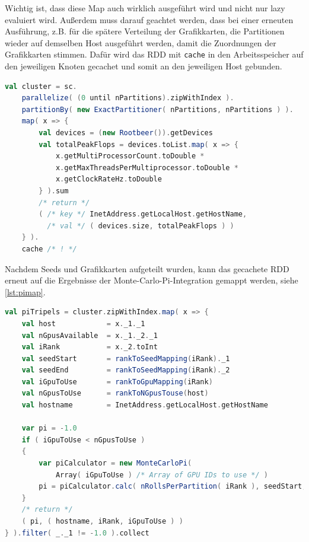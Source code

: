 Wichtig ist, dass diese Map auch wirklich ausgeführt wird und nicht nur lazy evaluiert wird.
Außerdem muss darauf geachtet werden, dass bei einer erneuten Ausführung, z.B. für die spätere Verteilung der Grafikkarten, die Partitionen wieder auf demselben Host ausgeführt werden, damit die Zuordnungen der Grafikkarten stimmen.
Dafür wird das RDD mit \lstinline!cache! in den Arbeitsspeicher auf den jeweiligen Knoten gecachet und somit an den jeweiligen Host gebunden.

\begin{lstlisting}[language=Scala,caption={Ausschnitt aus \lstinline!getClusterGpuConfiguration!, vgl. \lstinline!multiNode/multiGpu/scala/TestMonteCarloPi.scala!},label=lst:clusterconfig]
val cluster = sc.
    parallelize( (0 until nPartitions).zipWithIndex ).
    partitionBy( new ExactPartitioner( nPartitions, nPartitions ) ).
    map( x => {
        val devices = (new Rootbeer()).getDevices
        val totalPeakFlops = devices.toList.map( x => {
            x.getMultiProcessorCount.toDouble *
            x.getMaxThreadsPerMultiprocessor.toDouble *
            x.getClockRateHz.toDouble
        } ).sum
        /* return */
        ( /* key */ InetAddress.getLocalHost.getHostName,
          /* val */ ( devices.size, totalPeakFlops ) )
    } ).
    cache /* ! */
\end{lstlisting}

Nachdem Seeds und Grafikkarten aufgeteilt wurden, kann das gecachete RDD erneut auf die Ergebnisse der Monte-Carlo-Pi-Integration gemappt werden, siehe \autoref{lst:pimap}.
\begin{lstlisting}[language=Scala,label=lst:pimap,caption={Start der Berechnung über Spark und Rootbeer, vgl. \lstinline!TestMonteCarloPi.scala! \cite{scaromare}}]
val piTripels = cluster.zipWithIndex.map( x => {
    val host            = x._1._1
    val nGpusAvailable  = x._1._2._1
    val iRank           = x._2.toInt
    val seedStart       = rankToSeedMapping(iRank)._1
    val seedEnd         = rankToSeedMapping(iRank)._2
    val iGpuToUse       = rankToGpuMapping(iRank)
    val nGpusToUse      = rankToNGpusTouse(host)
    val hostname        = InetAddress.getLocalHost.getHostName

    var pi = -1.0
    if ( iGpuToUse < nGpusToUse )
    {
        var piCalculator = new MonteCarloPi(
            Array( iGpuToUse ) /* Array of GPU IDs to use */ )
        pi = piCalculator.calc( nRollsPerPartition( iRank ), seedStart, seedEnd )
    }
    /* return */
    ( pi, ( hostname, iRank, iGpuToUse ) )
} ).filter( _._1 != -1.0 ).collect
\end{lstlisting}


